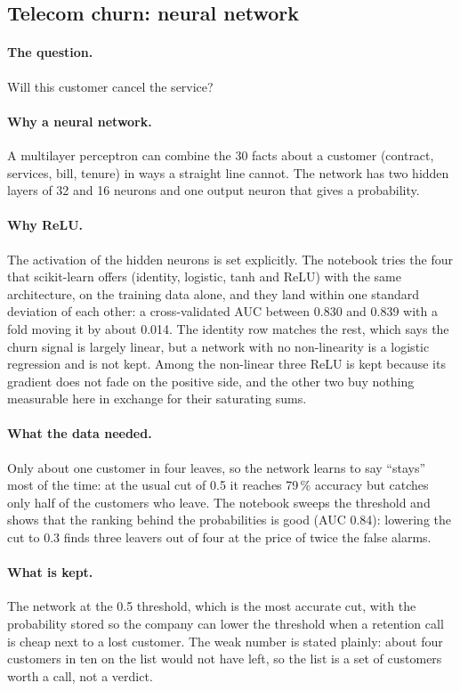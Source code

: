 \subsection{Telecom churn: neural network}

\paragraph{The question.} Will this customer cancel the service?

\paragraph{Why a neural network.} A multilayer perceptron can combine the
30 facts about a customer (contract, services, bill, tenure) in ways a
straight line cannot. The network has two hidden layers of 32 and 16
neurons and one output neuron that gives a probability.

\paragraph{Why ReLU.} The activation of the hidden neurons is set
explicitly. The notebook tries the four that scikit-learn offers
(identity, logistic, tanh and ReLU) with the same architecture, on the
training data alone, and they land within one standard deviation of each
other: a cross-validated AUC between 0.830 and 0.839 with a fold moving it
by about 0.014. The identity row matches the rest, which says the churn
signal is largely linear, but a network with no non-linearity is a logistic
regression and is not kept. Among the non-linear three ReLU is kept because
its gradient does not fade on the positive side, and the other two buy
nothing measurable here in exchange for their saturating sums.

\paragraph{What the data needed.} Only about one customer in four leaves,
so the network learns to say ``stays'' most of the time: at the usual cut
of 0.5 it reaches 79\,\% accuracy but catches only half of the customers
who leave. The notebook sweeps the threshold and shows that the ranking
behind the probabilities is good (AUC 0.84): lowering the cut to 0.3 finds
three leavers out of four at the price of twice the false alarms.

\paragraph{What is kept.} The network at the 0.5 threshold, which is the
most accurate cut, with the probability stored so the company can lower the
threshold when a retention call is cheap next to a lost customer. The
weak number is stated plainly: about four customers in ten on the list
would not have left, so the list is a set of customers worth a call, not a
verdict.


